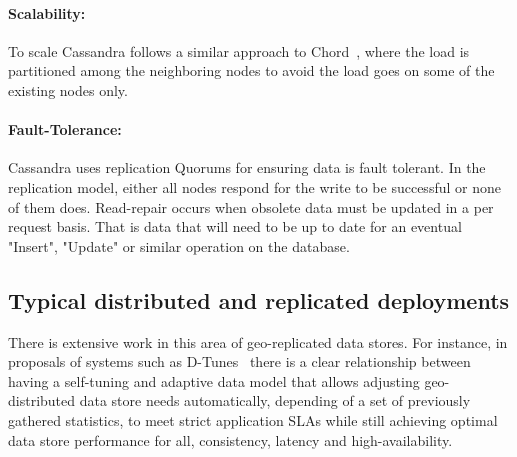 \paragraph{Scalability:}
To scale Cassandra follows a similar approach to Chord~\cite{Stoica:2001}, where the load is partitioned among the neighboring nodes to avoid the load goes on some of the existing nodes only.

\paragraph{Fault-Tolerance:}
Cassandra uses replication Quorums for ensuring data is fault tolerant. In the replication model, either all nodes respond for the write to be successful or none of them does. Read-repair occurs when obsolete data must be updated in a per request basis. That is data that will need to be up to date for an eventual "Insert", "Update" or similar operation on the database.

%


\subsection{Typical distributed and replicated deployments}\label{distributed-architecture}
There is extensive work in this area of geo-replicated data stores. For instance, in proposals of systems such as D-Tunes~\cite{PN:2013} there is a clear relationship between having a self-tuning and adaptive data model that allows adjusting geo-distributed data store needs automatically, depending of a set of previously gathered statistics, to meet strict application SLAs while still achieving optimal data store performance for all, consistency, latency and high-availability.

